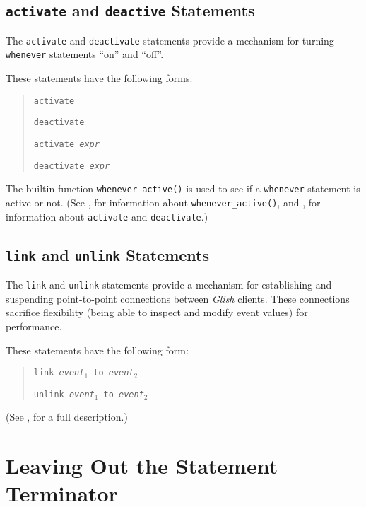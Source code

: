\subsection{{\tt activate} and {\tt deactive} Statements}

The {\tt activate} and {\tt deactivate} statements provide a mechanism
for turning {\tt whenever} statements ``on'' and ``off''.

These  statements have the following forms:
\begin{quote}
    {\tt activate }

    {\tt deactivate }

    {\tt activate {\em expr}}

    {\tt deactivate {\em expr}}
\end{quote}

The builtin function {\tt whenever\_active()} is used to see if
a {\tt whenever} statement is active or not. (See , for
information about {\tt whenever\_active()}, and , for
information about {\tt activate} and {\tt deactivate}.)

\subsection{{\tt link} and {\tt unlink} Statements}

The {\tt link} and {\tt unlink} statements provide a mechanism for
establishing and suspending point-to-point connections between {\em Glish}
clients.  These connections sacrifice flexibility (being able to inspect
and modify event values) for performance.

These  statements have the following form:
\begin{quote}
    {\tt link {\em event$_1$} to {\em event$_2$}}

    {\tt unlink {\em event$_1$} to {\em event$_2$}}
\end{quote}

(See , for a full description.)

\section{Leaving Out the Statement Terminator}
\label{semicolons}

